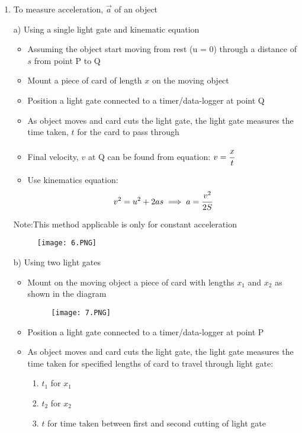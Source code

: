 \documentclass{article}
\begin{document}
\begin{enumerate}
 \item    To measure acceleration, $\vec{a}$ of an object
 \begin{flushleft}
 a) Using a single light gate and kinematic equation
 \end{flushleft}
    \begin{itemize}
        \item Assuming the object start moving from rest (u = 0) through a distance of $s$ from
point P to Q
\item Mount a piece of card of length $x$ on the moving object
\item  Position a light gate connected to a timer/data-logger at point Q
\item  As object moves and card cuts the light gate, the light gate measures the time taken, $t$
for the card to pass through
\item  Final velocity, $v$ at Q can be found from equation: $v=\cfrac{x}{t}$
\item Use kinematics equation: $$v^2=u^2+2as \\ \implies a=\cfrac{v^2}{2S}$$
    \end{itemize}
    \begin{flushleft}
    Note:This method applicable is only for constant acceleration
    \end{flushleft}
    \begin{figure}[H]
        \centering
        \texttt{[image: 6.PNG]}
    \end{figure}
    \begin{flushleft}
    b) Using two light gates
    \end{flushleft}
    \begin{itemize}
        \item Mount on the moving object a piece of card with lengths $x_1$ and $x_2$ as shown in the diagram
\begin{figure}[H]
    \centering
    \texttt{[image: 7.PNG]}
\end{figure}
        \item Position a light gate connected to a timer/data-logger at point P
        \item As object moves and card cuts the light gate, the light gate measures the time taken for specified lengths of card to travel through light gate:
        \begin{enumerate}
            \item $t_1$ for $x_1$
            \item $t_2$ for $x_2$
            \item $t$ for time taken between first and second cutting of light gate

\end{enumerate}
\end{itemize}
\end{enumerate}
\end{document}
